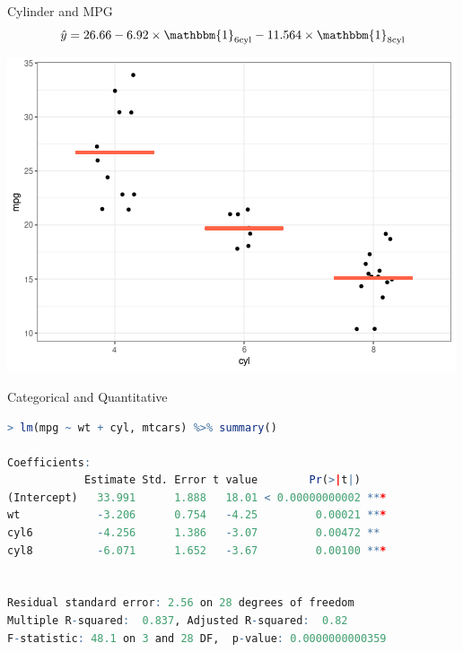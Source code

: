 \documentclass{beamer}
\begin{document}
\begin{frame}{Cylinder and MPG}
\begin{align*}
\hat{y} = 26.66 - 6.92 \times \mathbbm{1}_{6 \text{cyl}} - 11.564 \times \mathbbm{1}_{8 \text{cyl}}
\end{align*}
\begin{center}
\includegraphics[scale=0.5]{cyl_mpg.png}
\end{center}
\end{frame}

\begin{frame}[fragile]{Categorical and Quantitative}

\begin{lstlisting}[language=R]
> lm(mpg ~ wt + cyl, mtcars) %>% summary()

Coefficients:
            Estimate Std. Error t value        Pr(>|t|)    
(Intercept)   33.991      1.888   18.01 < 0.00000000002 ***
wt            -3.206      0.754   -4.25         0.00021 ***
cyl6          -4.256      1.386   -3.07         0.00472 ** 
cyl8          -6.071      1.652   -3.67         0.00100 ***


Residual standard error: 2.56 on 28 degrees of freedom
Multiple R-squared:  0.837,	Adjusted R-squared:  0.82 
F-statistic: 48.1 on 3 and 28 DF,  p-value: 0.0000000000359
\end{lstlisting}

\end{frame}
\end{document}
